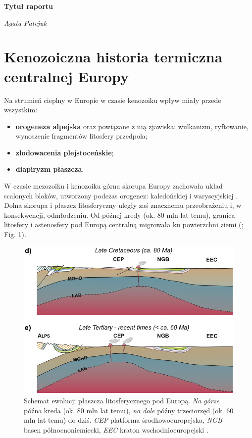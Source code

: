 \documentclass[11.5pt,twoside]{report}
\newcommand{\ct}[1]{\ignorespaces} %
\begin{document}
	
\begin{titlepage} %
	\centering
	\vspace*{5cm}
	{\Huge\bfseries Tytuł raportu\par}
	\vspace{1.3cm}
	{\Large\itshape Agata Patejuk}
\end{titlepage}

	
	\tableofcontents
	\thispagestyle{empty} %
	
	\chapter{Kenozoiczna historia termiczna centralnej Europy}
	
Na strumień cieplny w Europie w czasie kenozoiku wpływ miały przede wszystkim:
\begin{itemize}
	\item \textbf{orogeneza alpejska} oraz powiązane z nią zjawiska: wulkanizm, ryftowanie, wynoszenie fragmentów litosfery przedpola;
	\item \textbf{zlodowacenia plejstoceńskie};
	\item \textbf{diapiryzm płaszcza}.
\end{itemize}

W czasie mezozoiku i kenozoiku górna skorupa Europy \ct{(??platformowa)} zachowała układ scalonych bloków, utworzony podczas orogenez: kaledońskiej i waryscyjskiej \ct{zrodlo?}. Dolna skorupa i płaszcz litosferyczny uległy zaś znacznemu przeobrażeniu i, w konsekwencji, odmłodzeniu\ct{zrodlo}. Od pó\'{z}nej kredy (ok. 80 mln lat temu), granica litosfery i astenosfery pod Europą centralną migrowała ku powierzchni ziemi (\cite{Meier.2016}; Fig. 1). 

\begin{figure}[h]
	\centering
	\includegraphics[width=0.5\linewidth]{../Termika/Meier2016}
	\caption{Schemat ewolucji płaszcza litosferycznego pod Europą. \textit{Na górze} późna kreda (ok. 80 mln lat temu), \textit{na dole} późny trzeciorzęd (ok. 60 mln lat temu) do dziś. \textit{CEP} platforma środkowoeuropejska, \textit{NGB} basen północnoniemiecki, \textit{EEC} kraton wschodnioeuropejski \parencite{Meier.2016}.}
	\label{Fig.}
\end{figure}
\end{document}
